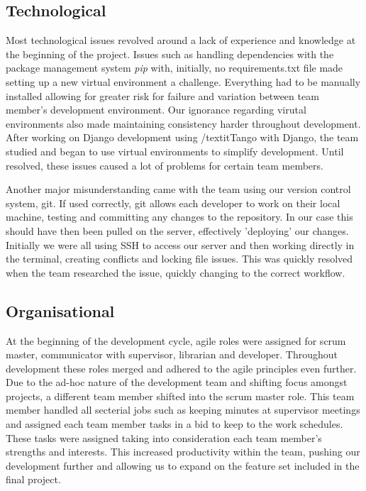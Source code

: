 \documentclass{l3proj}
\begin{document}
\subsection{Technological}
Most technological issues revolved around a lack of experience and knowledge at
the beginning of the project. Issues such as handling dependencies with the package management system \textit{pip} with, initially, no requirements.txt file made setting up a new virtual environment a challenge. Everything had to be manually installed allowing for greater risk for failure and variation between team member's development environment. Our ignorance regarding virutal environments also made maintaining consistency harder throughout development. After working on Django development using /textit{Tango with Django}, the team studied and began to use virtual environments to simplify development. Until resolved, these issues caused a lot of problems for certain team members.

Another major misunderstanding came with the team using our version control system, git. If used correctly, git allows each developer to work on their local machine, testing and committing any changes to the repository. In our case this should have then been pulled on the server, effectively 'deploying' our changes. Initially we were all using SSH to access our server and then working directly in the terminal, creating conflicts and locking file issues. This was quickly resolved when the team researched the issue, quickly changing to the correct workflow.

\subsection{Organisational}    At the beginning of the development cycle, agile roles were assigned for scrum master, communicator with supervisor, librarian and developer. Throughout development these roles merged and adhered to the agile principles even further. Due to the ad-hoc nature of the development team and shifting focus amongst projects, a different team member shifted into the scrum master role. This team member handled all secterial jobs such as keeping minutes at supervisor meetings and assigned each team member tasks in a bid to keep to the work schedules. These tasks were assigned taking into consideration each team member's strengths and interests. This increased productivity within the team, pushing our development further and allowing us to expand on the feature set included in the final project.
\end{document}
